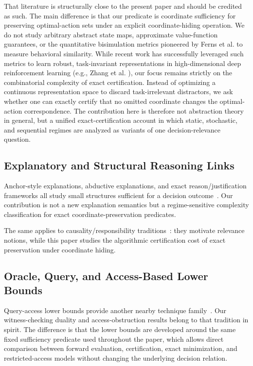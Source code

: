 That literature is structurally close to the present paper and should be credited as such. The main difference is that our predicate is coordinate sufficiency for preserving optimal-action sets under an explicit coordinate-hiding operation. We do not study arbitrary abstract state maps, approximate value-function guarantees, or the quantitative bisimulation metrics pioneered by Ferns et al. \cite{ferns2004metrics} to measure behavioral similarity. While recent work has successfully leveraged such metrics to learn robust, task-invariant representations in high-dimensional deep reinforcement learning (e.g., Zhang et al. \cite{zhang2021learning}), our focus remains strictly on the combinatorial complexity of exact certification. Instead of optimizing a continuous representation space to discard task-irrelevant distractors, we ask whether one can exactly certify that no omitted coordinate changes the optimal-action correspondence. The contribution here is therefore not abstraction theory in general, but a unified exact-certification account in which static, stochastic, and sequential regimes are analyzed as variants of one decision-relevance question.

\subsection{Explanatory and Structural Reasoning Links}

Anchor-style explanations, abductive explanations, and exact reason/justification frameworks all study small structures sufficient for a decision outcome~\cite{ribeiro2018anchors,ignatiev2019abduction,marques2022delivering,darwiche2023reasons}. Our contribution is not a new explanation semantics but a regime-sensitive complexity classification for exact coordinate-preservation predicates.

The same applies to causality/responsibility traditions~\cite{pearl2009causality,spirtes2000causation,halpern2001explanations,chockler2004responsibility}: they motivate relevance notions, while this paper studies the algorithmic certification cost of exact preservation under coordinate hiding.

\subsection{Oracle, Query, and Access-Based Lower Bounds}

Query-access lower bounds provide another nearby technique family~\cite{dobzinski2012query}. Our witness-checking duality and access-obstruction results belong to that tradition in spirit. The difference is that the lower bounds are developed around the same fixed sufficiency predicate used throughout the paper, which allows direct comparison between forward evaluation, certification, exact minimization, and restricted-access models without changing the underlying decision relation.

